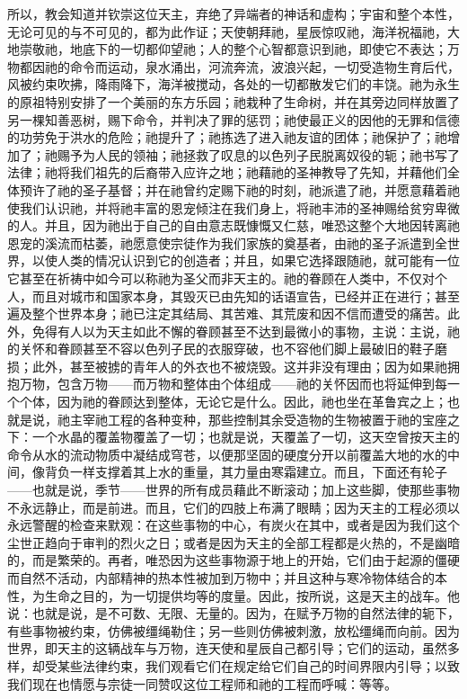 所以，教会知道并钦崇这位天主，弃绝了异端者的神话和虚构；宇宙和整个本性，无论可见的与不可见的，都为此作证；天使朝拜祂，星辰惊叹祂，海洋祝福祂，大地崇敬祂，地底下的一切都仰望祂；人的整个心智都意识到祂，即使它不表达；万物都因祂的命令而运动，泉水涌出，河流奔流，波浪兴起，一切受造物生育后代，风被约束吹拂，降雨降下，海洋被搅动，各处的一切都散发它们的丰饶。祂为永生的原祖特别安排了一个美丽的东方乐园；祂栽种了生命树，并在其旁边同样放置了另一棵知善恶树，赐下命令，并判决了罪的惩罚；祂使最正义的因他的无罪和信德的功劳免于洪水的危险；祂提升了；祂拣选了进入祂友谊的团体；祂保护了；祂增加了；祂赐予为人民的领袖；祂拯救了叹息的以色列子民脱离奴役的轭；祂书写了法律；祂将我们祖先的后裔带入应许之地；祂藉祂的圣神教导了先知，并藉他们全体预许了祂的圣子基督；并在祂曾约定赐下祂的时刻，祂派遣了祂，并愿意藉着祂使我们认识祂，并将祂丰富的恩宠倾注在我们身上，将祂丰沛的圣神赐给贫穷卑微的人。并且，因为祂出于自己的自由意志既慷慨又仁慈，唯恐这整个大地因转离祂恩宠的溪流而枯萎，祂愿意使宗徒作为我们家族的奠基者，由祂的圣子派遣到全世界，以使人类的情况认识到它的创造者；并且，如果它选择跟随祂，就可能有一位它甚至在祈祷中如今可以称祂为圣父而非天主的。祂的眷顾在人类中，不仅对个人，而且对城市和国家本身，其毁灭已由先知的话语宣告，已经并正在进行；甚至遍及整个世界本身；祂已注定其结局、其苦难、其荒废和因不信而遭受的痛苦。此外，免得有人以为天主如此不懈的眷顾甚至不达到最微小的事物，主说：主说，祂的关怀和眷顾甚至不容以色列子民的衣服穿破，也不容他们脚上最破旧的鞋子磨损；此外，甚至被掳的青年人的外衣也不被烧毁。这并非没有理由；因为如果祂拥抱万物，包含万物——而万物和整体由个体组成——祂的关怀因而也将延伸到每一个个体，因为祂的眷顾达到整体，无论它是什么。因此，祂也坐在革鲁宾之上；也就是说，祂主宰祂工程的各种变种，那些控制其余受造物的生物被置于祂的宝座之下：一个水晶的覆盖物覆盖了一切；也就是说，天覆盖了一切，这天空曾按天主的命令从水的流动物质中凝结成穹苍，以便那坚固的硬度分开以前覆盖大地的水的中间，像背负一样支撑着其上水的重量，其力量由寒霜建立。而且，下面还有轮子——也就是说，季节——世界的所有成员藉此不断滚动；加上这些脚，使那些事物不永远静止，而是前进。而且，它们的四肢上布满了眼睛；因为天主的工程必须以永远警醒的检查来默观：在这些事物的中心，有炭火在其中，或者是因为我们这个尘世正趋向于审判的烈火之日；或者是因为天主的全部工程都是火热的，不是幽暗的，而是繁荣的。再者，唯恐因为这些事物源于地上的开始，它们由于起源的僵硬而自然不活动，内部精神的热本性被加到万物中；并且这种与寒冷物体结合的本性，为生命之目的，为一切提供均等的度量。因此，按所说，这是天主的战车。他说：也就是说，是不可数、无限、无量的。因为，在赋予万物的自然法律的轭下，有些事物被约束，仿佛被缰绳勒住；另一些则仿佛被刺激，放松缰绳而向前。因为世界，即天主的这辆战车与万物，连天使和星辰自己都引导；它们的运动，虽然多样，却受某些法律约束，我们观看它们在规定给它们自己的时间界限内引导；以致我们现在也情愿与宗徒一同赞叹这位工程师和祂的工程而呼喊：等等。\par


